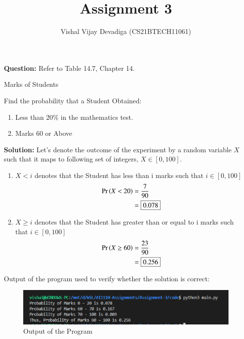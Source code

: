 \documentclass[journal,12pt,twocolumn]{IEEEtran}
\title{Assignment 3}
\author{Vishal Vijay Devadiga (CS21BTECH11061)}
\date{}
\providecommand{\pr}[1]{\ensuremath{\Pr\left(#1\right)}}
\providecommand{\sbrak}[1]{\ensuremath{{}\left[#1\right]}}
\newcommand{\question}{\noindent \textbf{Question: }}
\newcommand{\solution}{\noindent \textbf{Solution: }}
\begin{document}
\maketitle
\question
Refer to Table 14.7, Chapter 14.
\begin{table}[H]
	
	\caption{Marks of Students}
	\label{tab1}
\end{table}
Find the probability that a Student Obtained:
\begin{enumerate}[label=(\roman{enumi})]
	\item Less than 20\% in the mathematics test.
	\item Marks 60 or Above
\end{enumerate}
\solution
Let's denote the outcome of the experiment by a random variable $X$ such that it maps to following set of integers, $X\in \sbrak{0 , 100}$. \\
\begin{enumerate}[label=(\roman{enumi})]
\item $X < i$ denotes that the Student has less than i marks such that $i \in \sbrak{0 , 100}$
\begin{align}
	\pr{X < 20}    & = \frac{7}{90}
	\\
	& = \fbox{0.078}
\end{align}
\item $X \geq i$ denotes that the Student has greater than or equal to i marks such that $i \in \sbrak{0 , 100}$
\begin{align}
	\pr{X \geq 60} & = \frac{23}{90} 
	\\
	& = \fbox{0.256}
\end{align}
\end{enumerate}
Output of the program used to verify whether the solution is correct:
\begin{figure}[H]
		\centering
		\includegraphics[width = \columnwidth]{./figure/Output.png}
		\caption{Output of the Program}
		\label{fig1}
\end{figure}
\end{document}
